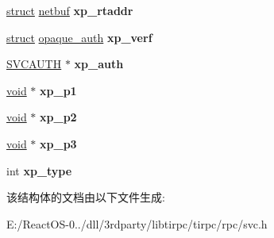 \begin{DoxyCompactItemize}
\item 
\mbox{\label{struct____rpc__svcxprt_a096a961db76786534db022a9ad0c6139}} 
\hyperlink{interfacestruct}{struct} \hyperlink{structnetbuf}{netbuf} {\bfseries xp\+\_\+rtaddr}
\item 
\mbox{\label{struct____rpc__svcxprt_aa07fd6cff4bfa2a8833aefbf4cb26fa5}} 
\hyperlink{interfacestruct}{struct} \hyperlink{structopaque__auth}{opaque\+\_\+auth} {\bfseries xp\+\_\+verf}
\item 
\mbox{\label{struct____rpc__svcxprt_a3620e8c1072d648dd3bcfe2ad40c92df}} 
\hyperlink{struct____svcauth}{S\+V\+C\+A\+U\+TH} $\ast$ {\bfseries xp\+\_\+auth}
\item 
\mbox{\label{struct____rpc__svcxprt_ae400c9936c366c0ab6a110eb0d6411dc}} 
\hyperlink{interfacevoid}{void} $\ast$ {\bfseries xp\+\_\+p1}
\item 
\mbox{\label{struct____rpc__svcxprt_a69b8c722a24ff2fbcb9dad73745def9c}} 
\hyperlink{interfacevoid}{void} $\ast$ {\bfseries xp\+\_\+p2}
\item 
\mbox{\label{struct____rpc__svcxprt_a211598741c5e55af1e113e11214e1bbf}} 
\hyperlink{interfacevoid}{void} $\ast$ {\bfseries xp\+\_\+p3}
\item 
\mbox{\label{struct____rpc__svcxprt_a51432798221c0a8c16b4accc1a830c6d}} 
int {\bfseries xp\+\_\+type}
\end{DoxyCompactItemize}


该结构体的文档由以下文件生成\+:\begin{DoxyCompactItemize}
\item 
E\+:/\+React\+O\+S-\/0../dll/3rdparty/libtirpc/tirpc/rpc/svc.\+h\end{DoxyCompactItemize}

